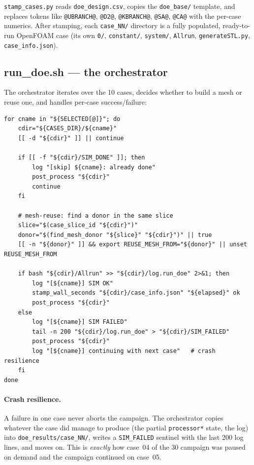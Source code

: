\documentclass[11pt,a4paper]{article}
\begin{document}
\texttt{stamp\_cases.py} reads \texttt{doe\_design.csv}, copies the
\texttt{doe\_base/} template, and replaces tokens like
\texttt{@UBRANCH@}, \texttt{@D2@}, \texttt{@KBRANCH@}, \texttt{@SA@},
\texttt{@CA@} with the per-case numerics. After stamping, each
\texttt{case\_NN/} directory is a fully populated, ready-to-run
OpenFOAM case (its own \texttt{0/}, \texttt{constant/}, \texttt{system/},
\texttt{Allrun}, \texttt{generateSTL.py}, \texttt{case\_info.json}).

\subsection{run\_doe.sh --- the orchestrator}

The orchestrator iterates over the 10 cases, decides whether to
build a mesh or reuse one, and handles per-case success/failure:

\begin{lstlisting}[style=bashstyle,caption={Core loop of \texttt{run\_doe.sh}}]
for cname in "${SELECTED[@]}"; do
    cdir="${CASES_DIR}/${cname}"
    [[ -d "${cdir}" ]] || continue

    if [[ -f "${cdir}/SIM_DONE" ]]; then
        log "[skip] ${cname}: already done"
        post_process "${cdir}"
        continue
    fi

    # mesh-reuse: find a donor in the same slice
    slice="$(case_slice_id "${cdir}")"
    donor="$(find_mesh_donor "${slice}" "${cdir}")" || true
    [[ -n "${donor}" ]] && export REUSE_MESH_FROM="${donor}" || unset REUSE_MESH_FROM

    if bash "${cdir}/Allrun" >> "${cdir}/log.run_doe" 2>&1; then
        log "[${cname}] SIM OK"
        stamp_wall_seconds "${cdir}/case_info.json" "${elapsed}" ok
        post_process "${cdir}"
    else
        log "[${cname}] SIM FAILED"
        tail -n 200 "${cdir}/log.run_doe" > "${cdir}/SIM_FAILED"
        post_process "${cdir}"
        log "[${cname}] continuing with next case"   # crash resilience
    fi
done
\end{lstlisting}

\paragraph{Crash resilience.}
A failure in one case never aborts the campaign. The orchestrator
copies whatever the case did manage to produce (the partial
\texttt{processor*} state, the log) into \texttt{doe\_results/case\_NN/},
writes a \texttt{SIM\_FAILED} sentinel with the last 200 log lines,
and moves on. This is \emph{exactly} how case~04 of the 30\textdegree{}
campaign was paused on demand and the campaign continued on case~05.
\end{document}
